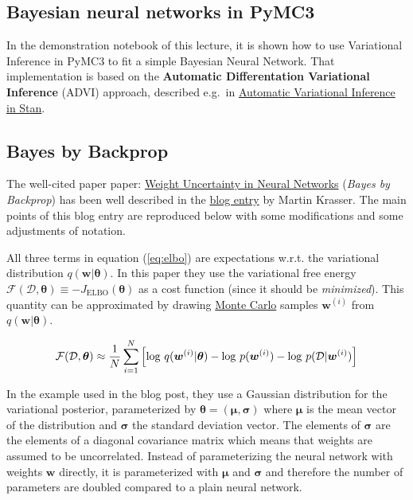\documentclass[%
oneside,                 %
final,                   %
10pt]{article}
\begin{document}
\subsection{Bayesian neural networks in PyMC3}
In the demonstration notebook of this lecture, it is shown how to use Variational Inference in PyMC3 to fit a simple Bayesian Neural Network. That implementation is based on the \textbf{Automatic Differentation Variational Inference} (ADVI) approach, described e.g.~in \href{{https://arxiv.org/abs/1506.03431}}{Automatic Variational Inference in Stan}.

\subsection{Bayes by Backprop}

The well-cited paper paper: \href{{https://arxiv.org/abs/1505.05424}}{Weight Uncertainty in Neural Networks} (\emph{Bayes by Backprop}) has been well described in the \href{{http://krasserm.github.io/2019/03/14/bayesian-neural-networks/}}{blog entry} by Martin Krasser. The main points of this blog entry are reproduced below with some modifications and some adjustments of notation. 

All three terms in equation (\ref{eq:elbo}) are expectations w.r.t. the variational distribution $q(\boldsymbol{w} \lvert \boldsymbol{\theta})$. In this paper they use the variational free energy $\mathcal{F}(\mathcal{D},\boldsymbol{\theta}) \equiv -J_\mathrm{ELBO}(\boldsymbol{\theta})$ as a cost function (since it should be \emph{minimized}). This quantity can be approximated by drawing \href{{https://en.wikipedia.org/wiki/Monte_Carlo_method}}{Monte Carlo} samples $\boldsymbol{w}^{(i)}$ from $q(\boldsymbol{w} \lvert \boldsymbol{\theta})$.

\begin{equation} 
\mathcal{F}(\mathcal{D},\boldsymbol{\theta}) \approx {1 \over N} \sum_{i=1}^N \left[
\log \, q(\boldsymbol{w}^{(i)} \lvert \boldsymbol{\theta}) -
\log \, p(\boldsymbol{w}^{(i)}) -
\log \, p(\mathcal{D} \lvert \boldsymbol{w}^{(i)})\right]
\label{eq:VariationalFreeEnergy}
\end{equation}

In the example used in the blog post, they use a Gaussian distribution for the variational posterior, parameterized by $\boldsymbol{\theta} = (\boldsymbol{\mu}, \boldsymbol{\sigma})$ where $\boldsymbol{\mu}$ is the mean vector of the distribution and $\boldsymbol{\sigma}$ the standard deviation vector. The elements of $\boldsymbol{\sigma}$ are the elements of a diagonal covariance matrix which means that weights are assumed to be uncorrelated. Instead of parameterizing the neural network with weights $\boldsymbol{w}$ directly, it is parameterized with $\boldsymbol{\mu}$ and $\boldsymbol{\sigma}$ and therefore the number of parameters are doubled compared to a plain neural network.
\end{document}
